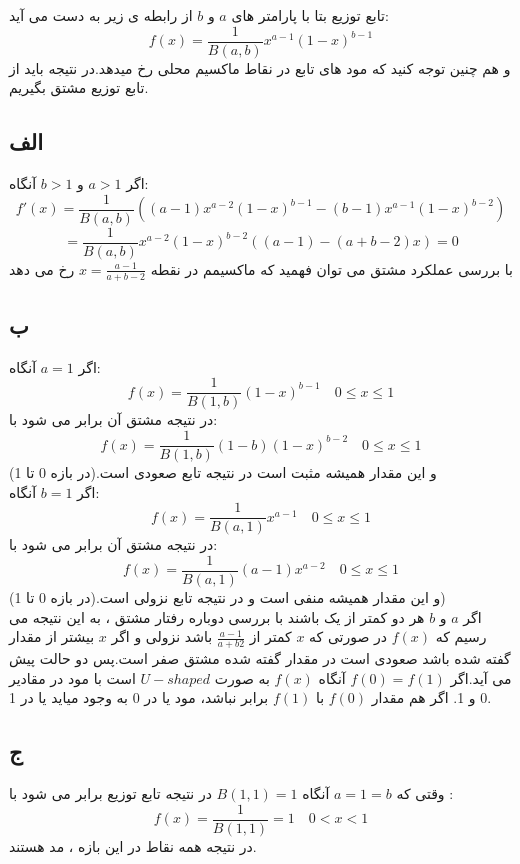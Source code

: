 
تابع توزیع بتا با پارامتر های $a$ و $b$ از رابطه ی زیر به دست می آید:
$$f(x) = \frac{1}{B(a,b)}x^{a - 1}(1 - x)^{b - 1}$$
و هم چنین توجه کنید که مود های تابع در نقاط ماکسیم محلی رخ میدهد.در نتیجه باید از تابع توزیع مشتق بگیریم.

\subsection*{الف}
اگر $a> 1$ و $b > 1$ آنگاه:
$$f'(x) = \frac{1}{B(a,b)}((a - 1)x ^ {a - 2}(1 - x)^{b - 1} - (b - 1)x ^ {a - 1}(1 - x)^ { b - 2})$$
$$= \frac{1}{B(a,b)}x^{a - 2}(1 - x)^{b - 2}((a - 1) - (a + b - 2)x) = 0 $$
با بررسی عملکرد مشتق می توان فهمید که ماکسیمم در نقطه $x = \frac{a - 1}{a +b - 2}$ رخ می دهد
\subsection*{ب}
اگر $a = 1$ آنگاه:
$$f(x) = \frac{1}{B(1,b)}(1 - x)^{b - 1} \quad 0 \leq x \leq 1$$
در نتیجه مشتق آن برابر می شود با:
$$f(x) = \frac{1}{B(1,b)}(1 - b)(1 - x)^{b - 2} \quad 0 \leq x \leq 1$$
و این مقدار همیشه مثبت است در نتیجه تابع صعودی است.(در بازه 0 تا 1) \\
اگر $b = 1$ آنگاه:
$$f(x) = \frac{1}{B(a , 1)}x ^ {a - 1} \quad 0 \leq x \leq 1$$
در نتیجه مشتق آن برابر می شود با:
$$f(x) = \frac{1}{B(a , 1)}(a - 1)x ^ {a - 2} \quad 0 \leq x \leq 1$$
و این مقدار همیشه منفی است و در نتیجه تابع نزولی است.(در بازه 0 تا 1))\\
اگر $a$ و $b$ هر دو کمتر از یک باشند با بررسی دوباره رفتار مشتق ، به این نتیجه می رسیم که $f(x)$ در صورتی که $x$ کمتر از $\frac{a - 1}{a + b   2}$ باشد نزولی و اگر $x$ بیشتر از مقدار گفته شده باشد صعودی است در مقدار گفته شده مشتق صفر است.پس دو حالت پیش می آید.اگر $f(0) = f(1)$ آنگاه $f(x)$ به صورت $U-shaped$ است با مود در مقادیر 0 و 1. اگر هم مقدار $f(0)$ با $f(1)$ برابر نباشد، مود یا در 0 به وجود میاید یا در 1.

\subsection*{ج}
وقتی که $a = 1 = b$ آنگاه $B(1 , 1) = 1$ در نتیجه تابع توزیع برابر می شود با :
$$f(x) = \frac{1}{B(1,1)} = 1 \quad 0 < x < 1 $$
 در نتیجه همه نقاط در این بازه ، مد هستند.
